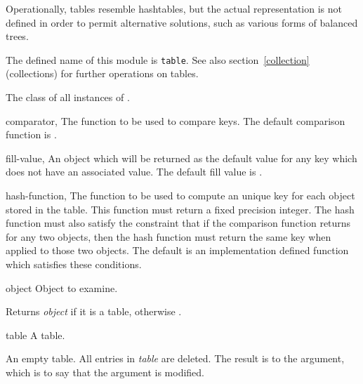 \label{table}
%
\begin{optRationale}
    Operationally, tables resemble hashtables, but the actual representation is
    not defined in order to permit alternative solutions, such as various forms
    of balanced trees.
\end{optRationale}
%
\begin{optDefinition}
The defined name of this module is {\tt table}.  See also
section~\ref{collection} (collections) for further operations on tables.

%
The class of all instances of .
%
\begin{initoptions}
    \item[comparator, \classref{function}]%
    The function to be used to compare keys.  The default comparison function is
    .

    \item[fill-value, \classref{object}]%
    An object which will be returned as the default value for any key which does
    not have an associated value.  The default fill value is \nil{}.

    \item[hash-function, \classref{function}]%
    The function to be used to compute an unique key for each object stored in
    the table.  This function must return a fixed precision integer.  The hash
    function must also satisfy the constraint that if the comparison function
    returns \true{} for any two objects, then the hash function must return the
    same key when applied to those two objects.  The default is an
    implementation defined function which satisfies these conditions.
\end{initoptions}

%
\begin{arguments}
    \item[object] Object to examine.
\end{arguments}
%
\result%
Returns {\em object\/} if it is a table, otherwise \nil{}.

%
\begin{arguments}
    \item[table] A table.
\end{arguments}
%
\result%
An empty table.
%
\remarks%
All entries in {\em table\/} are deleted.  The result is  to the
argument, which is to say that the argument is modified.
%
\end{optDefinition}
